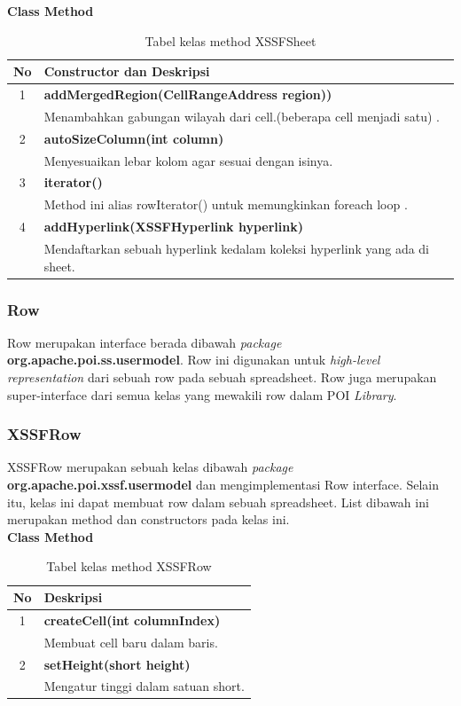 \noindent \textbf{Class Method}
\begin{table}[H]
		\centering
		\caption{Tabel kelas method XSSFSheet}
		\label{tab:methodXSSFSheet}
	\begin{tabular}{|c|p{12cm}|}
		\hline
		\textbf{No} & \textbf{Constructor dan Deskripsi} \\ \hline \hline
		1 & \textbf{addMergedRegion(CellRangeAddress region))}\\
			&	Menambahkan gabungan wilayah dari cell.(beberapa cell menjadi satu)   .\\ \hline 
		2 & \textbf{autoSizeColumn(int column)}\\
			& Menyesuaikan lebar kolom agar sesuai dengan isinya.\\ \hline
		3 & \textbf{iterator()}\\
			&	Method ini alias rowIterator() untuk memungkinkan foreach loop .\\ \hline
		4 & \textbf{addHyperlink(XSSFHyperlink hyperlink)}\\
			&	Mendaftarkan sebuah hyperlink kedalam koleksi hyperlink yang ada di sheet.\\ \hline	
	\end{tabular}
\end{table}

\subsubsection{Row}
\label{subs:Row}
Row merupakan interface berada dibawah \textit{package} \textbf{org.apache.poi.ss.usermodel}. Row ini digunakan untuk \textit{high-level representation} dari sebuah row pada sebuah spreadsheet. Row juga merupakan super-interface dari semua kelas yang mewakili row dalam POI \textit{Library}.\cite{apachepoi2}

\subsubsection{XSSFRow}
\label{subs:XSSFRow}
XSSFRow merupakan sebuah kelas dibawah \textit{package} \textbf{org.apache.poi.xssf.usermodel} dan mengimplementasi Row interface. Selain itu, kelas ini dapat membuat row dalam sebuah spreadsheet. List dibawah ini merupakan method dan constructors pada kelas ini.\cite{apachepoi2}
 \\ 
\noindent \textbf{Class Method}
\begin{table}[H]
		\centering
		\caption{Tabel kelas method XSSFRow}
		\label{tab:methodXSSFRow}
	\begin{tabular}{|c|p{12cm}|}
		\hline
		\textbf{No} & \textbf{Deskripsi} \\ \hline \hline
		1 & \textbf{createCell(int columnIndex)}\\
			&	Membuat cell baru dalam baris.\\ \hline 
		2 & \textbf{setHeight(short height)}\\
			&	Mengatur tinggi dalam satuan short.\\ \hline
	\end{tabular}
\end{table}

